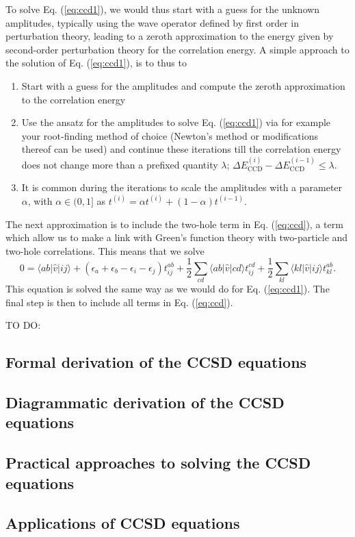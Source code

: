 \documentclass[%
oneside,                 %
final,                   %
10pt]{article}
\begin{document}
To solve Eq. (\ref{eq:ccd1}), we would thus start with a guess for the unknown amplitudes, typically using the wave operator defined by first order in perturbation theory, leading to a zeroth approximation to the energy given by second-order perturbation theory for the correlation energy.
A simple approach to the solution of  Eq. (\ref{eq:ccd1}), is to thus to
\begin{enumerate}
\item Start with a guess for the amplitudes and compute the zeroth approximation to the correlation energy

\item Use the ansatz for the amplitudes to solve Eq. (\ref{eq:ccd1}) via for example your root-finding method of choice (Newton's method or modifications thereof can be used) and continue these iterations till the correlation energy does not change more than a prefixed quantity $\lambda$; $\Delta E_{\mathrm{CCD}}^{(i)}-\Delta E_{\mathrm{CCD}}^{(i-1)} \le \lambda$.

\item It is common during the iterations to scale the amplitudes with a parameter $\alpha$, with $\alpha \in (0,1]$ as  $t^{(i)}=\alpha t^{(i)}+(1-\alpha)t^{(i-1)}$.
\end{enumerate}

\noindent
The next approximation is to include the two-hole term in Eq. (\ref{eq:ccd}), a term which allow us to make a link with Green's function theory with two-particle and two-hole correlations. This means that we solve
\begin{equation}
0 = \langle ab \vert \hat{v} \vert ij \rangle + \left(\epsilon_a+\epsilon_b-\epsilon_i-\epsilon_j\right)t_{ij}^{ab}+\frac{1}{2}\sum_{cd} \langle ab \vert \hat{v} \vert cd \rangle t_{ij}^{cd}+\frac{1}{2}\sum_{kl} \langle kl \vert \hat{v} \vert ij \rangle t_{kl}^{ab}.
\label{eq:ccd2}
\end{equation}
This equation is solved the same way as we would do for Eq. (\ref{eq:ccd1}). The final step is then to include all terms in Eq. (\ref{eq:ccd}). 


TO DO:
\subsection*{Formal derivation of the CCSD equations}

\subsection*{Diagrammatic derivation of the CCSD equations}

\subsection*{Practical approaches to solving the CCSD equations}

\subsection*{Applications of CCSD equations}




\printindex
\end{document}

